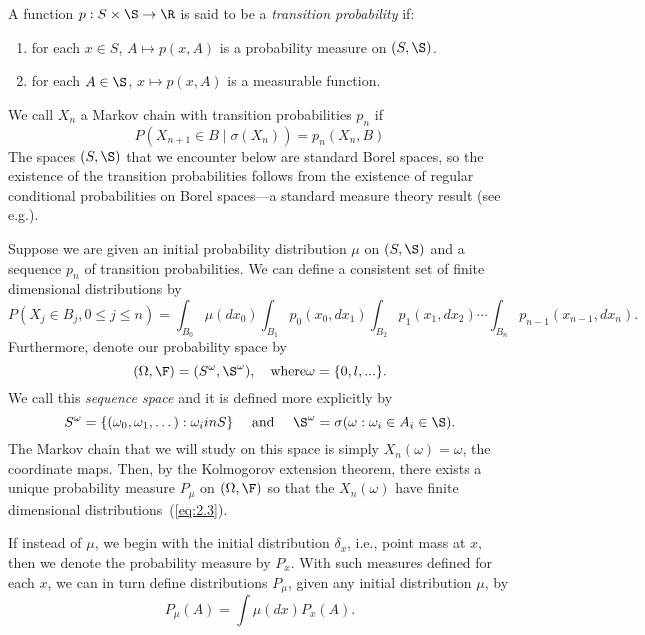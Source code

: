 \begin{definition}
A function $p : S \times \S \rightarrow \R$ is said to be a \emph{transition probability} if:
\begin{enumerate}
\item for each $x \in S$, $A \mapsto p(x, A)$ is a probability measure on $(S, \S)$.
\item for each $A \in \S$, $x \mapsto p(x, A)$ is a measurable function.
\end{enumerate}
\end{definition}
We call $X_n$ a Markov chain with transition probabilities $p_n$ if
\begin{equation}
\label{eq:2.2}
P(X_{n+1} \in B \mid  \sigma(X_n)) = p_n(X_n, B)
\end{equation}
The spaces $(S, \S)$ that we encounter below are standard Borel spaces, so the existence of the
transition probabilities follows from the existence of regular conditional
probabilities on Borel spaces---a standard measure theory result 
(see e.g.\cite{Durret:1996}). %

Suppose we are given an initial probability distribution $\mu$ on $(S, \S)$ and a sequence $p_n$ of
transition probabilities. We can define a consistent set of finite dimensional distributions by
\begin{equation}
\label{eq:2.3}
P(X_j\in B_j ,0 \leq j \leq n) = \int_{B_0} \mu(dx_0) \int_{B_1} p_0(x_0, dx_1) 
\int_{B_2} p_1(x_1, dx_2) \cdots 
\int_{B_n} p_{n-1}(x_{n-1}, dx_n).
\end{equation}
Furthermore, denote our probability space by
\[
(\Omega, \F) = (S^\omega,\S^\omega), \quad \text{where} \omega = \{0,l,...\}.
\]
We call this \emph{sequence space} and it is defined more explicitly by
\[
S^\omega  = \{(\omega_0, \omega_1, \dots) : \omega_i in S\}\quad \text{ and }
\quad
\S^\omega  = \sigma(\omega : \omega_i \in A_i \in \S).
\]
The Markov chain that we will study on this space is simply $X_n(\omega) = \omega$, the coordinate maps.
Then, by the Kolmogorov extension theorem, there exists a unique probability measure $P_\mu$ on
$(\Omega, \F)$ so that the $X_n(\omega)$ have finite dimensional distributions~(\ref{eq:2.3}).

If instead of $\mu$, we begin with the initial distribution $\delta_x$, i.e., point mass at $x$, then we
denote the probability measure by $P_x$. With such measures defined for each $x$, we can in turn
define distributions $P_\mu$, given any initial distribution $\mu$, by
\[
P_\mu(A) = \int \mu(dx)P_x(A).
\]

